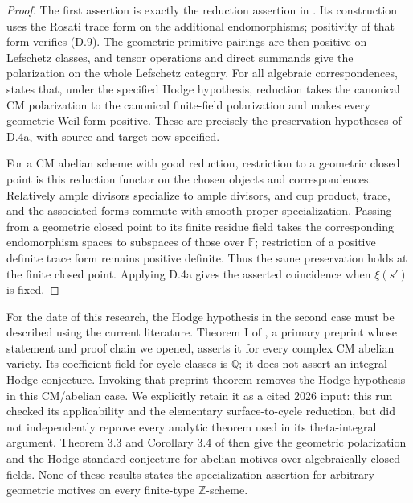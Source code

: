 \begin{proof}
The first assertion is exactly the reduction assertion in
\citet[Remark 3.7, pp.~608--609]{D_Milne2002}. Its construction uses the
Rosati trace form on the additional endomorphisms; positivity of that
form verifies (D.9). The geometric primitive pairings are then positive
on Lefschetz classes, and tensor operations and direct summands give
the polarization on the whole Lefschetz category. For all algebraic
correspondences, \citet[Theorem 2.1, p.~604]{D_Milne2002} states that,
under the specified Hodge hypothesis, reduction takes the canonical
CM polarization to the canonical finite-field polarization and makes
every geometric Weil form positive. These are precisely the
preservation hypotheses of D.4a, with source and target now specified.

For a CM abelian scheme with good reduction, restriction to a geometric
closed point is this reduction functor on the chosen objects and
correspondences. Relatively ample divisors specialize to ample divisors,
and cup product, trace, and the associated forms commute with smooth
proper specialization. Passing from a geometric closed point to its
finite residue field takes the corresponding endomorphism spaces to
subspaces of those over $\mathbb F$; restriction of a positive definite
trace form remains positive definite. Thus the same preservation
holds at the finite closed point. Applying D.4a gives the asserted
coincidence when $\xi(s')$ is fixed.
\end{proof}

For the date of this research, the Hodge hypothesis in the second case
must be described using the current literature. Theorem I of
\citet{D_VanHoftenSempliner2026}, a primary preprint whose statement and
proof chain we opened, asserts it for every complex CM abelian variety.
Its coefficient field for cycle classes is $\mathbb Q$; it does not
assert an integral Hodge conjecture. Invoking that preprint theorem
removes the Hodge hypothesis in this CM/abelian case. We explicitly
retain it as a cited 2026 input: this run checked its applicability and
the elementary surface-to-cycle reduction, but did not independently
reprove every analytic theorem used in its theta-integral argument.
Theorem 3.3 and Corollary 3.4 of \citet[pp.~607--608]{D_Milne2002}
then give the geometric polarization and the Hodge standard
conjecture for abelian motives over algebraically closed fields.
None of these results states the specialization assertion for arbitrary
geometric motives on every finite-type $\mathbb Z$-scheme.

